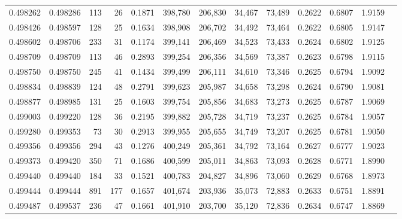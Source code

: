 \begin{tabular}{rrrrrrrrrrrrr}
0.498262 & 0.498286 &   113 &    26 &                                     0.1871 & 398,780 & 206,830 &  34,467 &  73,489 & 0.2622 & 0.6807 & 1.9159 \\
0.498426 & 0.498597 &   128 &    25 &                                     0.1634 & 398,908 & 206,702 &  34,492 &  73,464 & 0.2622 & 0.6805 & 1.9147 \\
0.498602 & 0.498706 &   233 &    31 &                                     0.1174 & 399,141 & 206,469 &  34,523 &  73,433 & 0.2624 & 0.6802 & 1.9125 \\
0.498709 & 0.498709 &   113 &    46 &                                     0.2893 & 399,254 & 206,356 &  34,569 &  73,387 & 0.2623 & 0.6798 & 1.9115 \\
0.498750 & 0.498750 &   245 &    41 &                                     0.1434 & 399,499 & 206,111 &  34,610 &  73,346 & 0.2625 & 0.6794 & 1.9092 \\
0.498834 & 0.498839 &   124 &    48 &                                     0.2791 & 399,623 & 205,987 &  34,658 &  73,298 & 0.2624 & 0.6790 & 1.9081 \\
0.498877 & 0.498985 &   131 &    25 &                                     0.1603 & 399,754 & 205,856 &  34,683 &  73,273 & 0.2625 & 0.6787 & 1.9069 \\
0.499003 & 0.499220 &   128 &    36 &                                     0.2195 & 399,882 & 205,728 &  34,719 &  73,237 & 0.2625 & 0.6784 & 1.9057 \\
0.499280 & 0.499353 &    73 &    30 &                                     0.2913 & 399,955 & 205,655 &  34,749 &  73,207 & 0.2625 & 0.6781 & 1.9050 \\
0.499356 & 0.499356 &   294 &    43 &                                     0.1276 & 400,249 & 205,361 &  34,792 &  73,164 & 0.2627 & 0.6777 & 1.9023 \\
0.499373 & 0.499420 &   350 &    71 &                                     0.1686 & 400,599 & 205,011 &  34,863 &  73,093 & 0.2628 & 0.6771 & 1.8990 \\
0.499440 & 0.499440 &   184 &    33 &                                     0.1521 & 400,783 & 204,827 &  34,896 &  73,060 & 0.2629 & 0.6768 & 1.8973 \\
0.499444 & 0.499444 &   891 &   177 &                                     0.1657 & 401,674 & 203,936 &  35,073 &  72,883 & 0.2633 & 0.6751 & 1.8891 \\
0.499487 & 0.499537 &   236 &    47 &                                     0.1661 & 401,910 & 203,700 &  35,120 &  72,836 & 0.2634 & 0.6747 & 1.8869 \\

\end{tabular}
